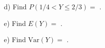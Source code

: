 \documentclass{ximera}
\begin{document}
\begin{question}
     \begin{solution}
          d) Find $P(1/4 < Y \leq 2/3 ) = $  .
     \end{solution}
\end{question}

\begin{question}
     \begin{solution}
          e) Find $E(Y) = $  .
     \end{solution}
\end{question}

\begin{question}
     \begin{solution}
          e) Find $\text{Var}(Y) = $  .
     \end{solution}
\end{question}
\end{document}
